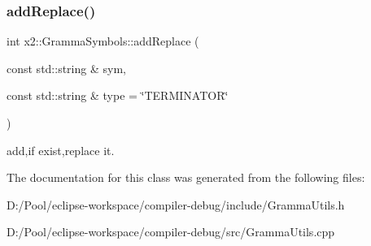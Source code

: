 \subsubsection{\texorpdfstring{add\+Replace()}{addReplace()}}
{\footnotesize\ttfamily int x2\+::\+Gramma\+Symbols\+::add\+Replace (\begin{DoxyParamCaption}\item[{const std\+::string \&}]{sym,  }\item[{const std\+::string \&}]{type = {\ttfamily \char`\"{}TERMINATOR\char`\"{}} }\end{DoxyParamCaption})\hspace{0.3cm}{\ttfamily [inline]}}

add,if exist,replace it. 

The documentation for this class was generated from the following files\+:\begin{DoxyCompactItemize}
\item 
D\+:/\+Pool/eclipse-\/workspace/compiler-\/debug/include/Gramma\+Utils.\+h\item 
D\+:/\+Pool/eclipse-\/workspace/compiler-\/debug/src/Gramma\+Utils.\+cpp\end{DoxyCompactItemize}
